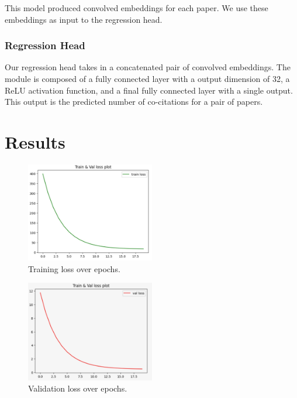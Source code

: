 \documentclass[10pt,twocolumn,letterpaper]{article}
\begin{document}
This model produced convolved embeddings for each paper. We use these embeddings as input to the regression head.

\subsubsection{Regression Head}

Our regression head takes in a concatenated pair of convolved embeddings.
The module is composed of a fully connected layer with a output dimension of 32, a ReLU activation function, and a final fully connected layer with a single output. This output is the predicted number of co-citations for a pair of papers.


\section{Results}


\begin{figure}
      \centering
      \includegraphics[width=0.5\textwidth]{figures/train-loss.jpeg}
      \caption{Training loss over epochs.}
      \label{fig:train_loss}
\end{figure}

\begin{figure}
   \centering
   \includegraphics[width=0.5\textwidth]{figures/val-loss.jpeg}
   \caption{Validation loss over epochs.}
   \label{fig:val_loss}
\end{figure}
\end{document}
